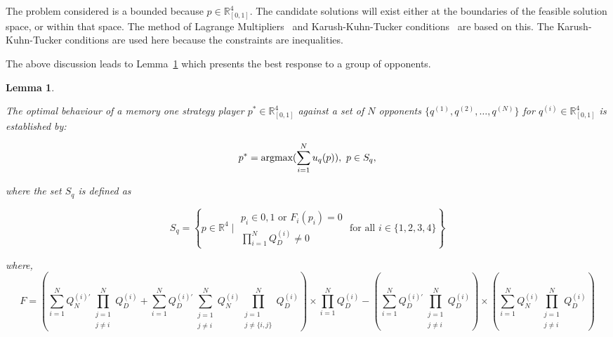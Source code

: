 \documentclass[10pt]{article}
\newcommand{\R}{\mathbb{R}}
\newtheorem{lemma}[theorem]{Lemma}
\begin{document}
The problem considered is a bounded because \(p \in \R^4_{[0, 1]}\).
The candidate solutions will exist either at the boundaries
of the feasible solution space, or within that space. The method of Lagrange
Multipliers~\cite{bertsekas2014} and Karush-Kuhn-Tucker
conditions~\cite{Giorgi2016} are based on this. The Karush-Kuhn-Tucker
conditions are used here because the constraints are inequalities.

The above discussion leads to Lemma~\ref{lemma:memone_group_best_response} which
presents the best response to a group of opponents.

\begin{lemma}\label{lemma:memone_group_best_response}

    The optimal behaviour of a memory one strategy player
    \(p^* \in \R_{[0, 1]} ^ 4\)
    against a set of \(N\) opponents \(\{q^{(1)}, q^{(2)}, \dots, q^{(N)} \}\)
    for \(q^{(i)} \in \R_{[0, 1]} ^ 4\) is established by:

    \[p^* = \textnormal{argmax}(\sum\limits_{i=1} ^ N  u_q(p)), \ p \in S_q,\]

    where the set \(S_q\) is defined as

    \[
        S_q =
        \left\{p \in \mathbb{R} ^ 4\;|\;
            \begin{array}{c}
                p_i \in{0, 1}\text{ or }F_i(p_i) = 0\\
                \prod\limits_{i=1} ^ N Q_{D}^{(i)} \neq 0
            \end{array}
            \text{ for all } i\in\{1, 2, 3, 4\}
        \right\}
    \]


    where,
    \begin{equation}\label{eq:group_derivative_numerator_condition}
    F=(\sum\limits_{i=1} ^ {N} Q_{N}^{(i)'} \prod_{\substack{j=1 \\ j \neq i}} ^ N Q_{D}^{(i)}
     + \sum\limits_{i=1} ^ {N} Q_{D}^{(i)'} \sum_{\substack{j=1 \\ j \neq i}} ^ {N} Q_{N}^{(i)}
    \prod_{\substack{j=1 \\ j \neq \{i, j\}}} ^ N Q_{D}^{(i)}) \times
    \prod\limits_{i=1} ^ N Q_{D}^{(i)} - (\sum\limits_{i=1} ^ {N} Q_{D}^{(i)'}
    \prod_{\substack{j=1 \\ j \neq i}} ^ N Q_{D}^{(i)}) \times
    (\sum\limits_{i=1} ^ {N} Q_{N}^{(i)} \prod_{\substack{j=1 \\ j \neq i}} ^ N Q_{D}^{(i)})
    \end{equation}


\end{lemma}
\end{document}
